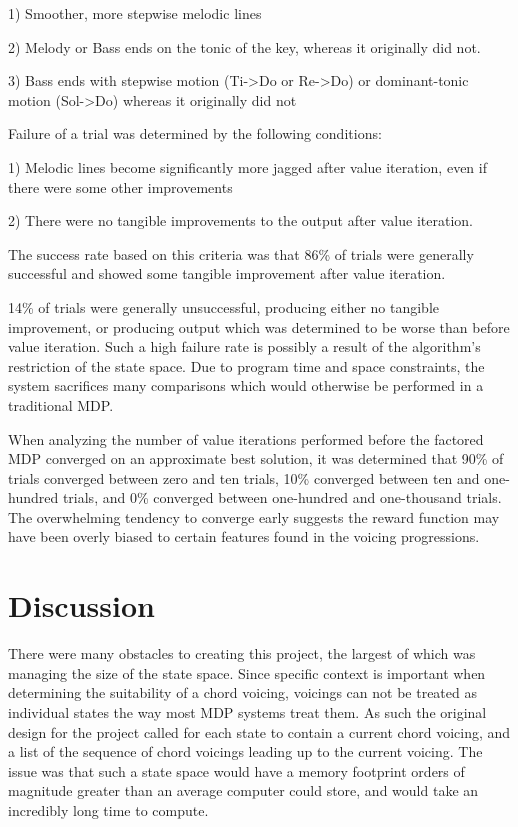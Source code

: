 \documentclass{chi2009}
\begin{document}
1) Smoother, more stepwise melodic lines

2) Melody or Bass ends on the tonic of the key, whereas it originally did not.

3) Bass ends with stepwise motion (Ti->Do or Re->Do) or dominant-tonic motion (Sol->Do) whereas it originally did not

Failure of a trial was determined by the following conditions:

1) Melodic lines become significantly more jagged after value iteration, even if there were some other improvements 

2) There were no tangible improvements to the output after value iteration. 

The success rate based on this criteria was that 86\% of trials were generally successful and showed some tangible improvement after value iteration.  

14\% of trials were generally unsuccessful, producing either no tangible improvement, or producing output which was determined to be worse than before value iteration.  Such a high failure rate is possibly a result of the algorithm's restriction of the state space.  Due to program time and space constraints, the system sacrifices many comparisons which would otherwise be performed in a traditional MDP.


When analyzing the number of value iterations performed before the factored MDP converged on an approximate best solution, it was determined that 90\% of trials converged between zero and ten trials, 10\% converged between ten and one-hundred trials, and 0\% converged between one-hundred and one-thousand trials.  The overwhelming tendency to converge early suggests the reward function may have been overly biased to certain features found in the voicing progressions.  

\section{Discussion}
There were many obstacles to creating this project, the largest of which was managing the size of the state space.  Since specific context is important when determining the suitability of a chord voicing, voicings can not be treated as individual states the way most MDP systems treat them. As such the original design for the project called for each state to contain a current chord voicing, and a list of the sequence of chord voicings leading up to the current voicing.  The issue was that such a state space would have a memory footprint orders of magnitude greater than an average computer could store, and would take an incredibly long time to compute.  
\end{document}
